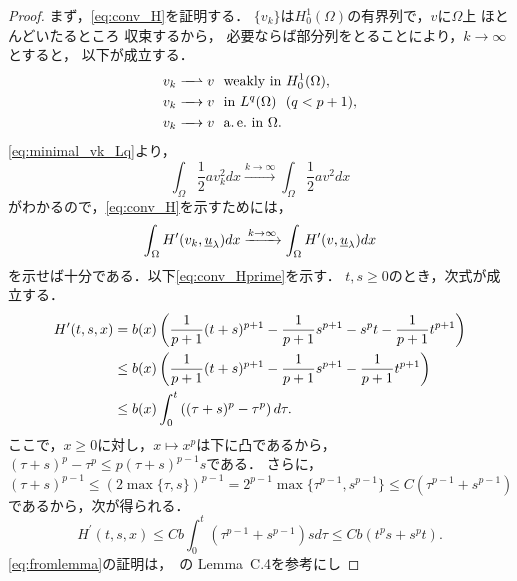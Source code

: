\begin{proof}
 まず，\eqref{eq:conv_H}を証明する．
 $\{ v_k \}$は$H_0^1(\Omega)$の有界列で，$v$に$\Omega$上
 ほとんどいたるところ
 収束するから，
 必要ならば部分列をとることにより，$k \to \infty$とすると，
 以下が成立する．
 \begin{align}
  v_k \xrightharpoonup{ \mbox{ ~ } } v & \ \ \text{weakly~} \tin
  H_0^1(\Omega), \label{eq:minimal_vk_weakly} \\
  v_k \xrightarrow{ \mbox{ ~ } } v & \ \ \tin L^q(\Omega) \ \
   (q < p+1), \label{eq:minimal_vk_Lq} \\
  v_k \xrightarrow{ \mbox{ ~ } } v & \ \ \ae \tin \Omega. 
    \label{eq:minimal_vk_ae}
 \end{align}
 \eqref{eq:minimal_vk_Lq}より，
 \[
  \int_\Omega \frac{1}{2} a v_k^2 dx \xrightarrow{k \to \infty}
 \int_\Omega \frac{1}{2}av^2 dx
 \]
 がわかるので，\eqref{eq:conv_H}を示すためには，
 \begin{equation}
  \int_\Omega H^\prime(v_k, \underline{u}_\lambda)dx \xrightarrow{ k \to \infty } 
  \int_\Omega H^\prime(v, \underline{u}_\lambda)dx \label{eq:conv_Hprime} \\  
 \end{equation}
 を示せば十分である．以下\eqref{eq:conv_Hprime}を示す．
 $t, s \geq 0$のとき，次式が成立する．
 \begin{align}
  H^\prime(t, s, x) &= b(x) \left( \frac{1}{p+1}(t+s)^{p+1} -
  \frac{1}{p+1} s^{p+1} - s^p t - \frac{1}{p+1} t^{p+1} \right) \notag \\
  & \leq b(x) \left( \frac{1}{p+1}(t+s)^{p+1} - \frac{1}{p+1}s^{p+1} -
  \frac{1}{p+1} t^{p+1}\right) \notag \\
  & \leq b(x) \int_0^t \left( (\tau + s)^p - \tau^p \right)
  d\tau. \label{eq:dtau} 
 \end{align}
 ここで，$x \geq 0$に対し，$x \mapsto x^p$は下に凸であるから，
 $(\tau + s)^p - \tau^p \leq p(\tau + s)^{p-1} s$である．
 さらに，
 \begin{equation}
  (\tau + s)^{p-1} \leq (2 \max\{\tau , s\})^{p-1} = 2^{p-1} \max \{
   \tau^{p-1}, s^{p-1} \} \leq C (\tau^{p-1} + s^{p-1}) \label{eq:taus2p-1}
 \end{equation}
 であるから，次が得られる．
 \begin{equation}
  H^\prime(t, s, x) \leq C b \int_0^t (\tau^{p-1} + s^{p-1}) s d \tau
   \leq C b ( t^{p} s + s^{p} t). \label{eq:fromlemma}
 \end{equation}
 \eqref{eq:fromlemma}の証明は，\cite{MR2317491}~の Lemma~C.4を参考にし

\end{proof}
